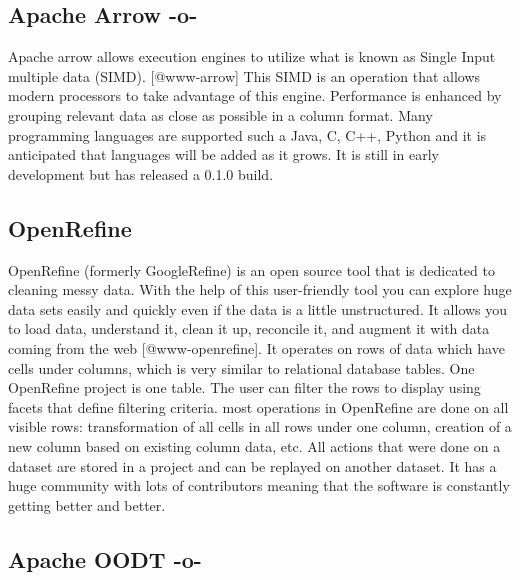 \subsection{Apache Arrow -o-}
     
Apache arrow allows execution engines to utilize what is known as
Single Input multiple data (SIMD). [@www-arrow] This SIMD is an
operation that allows modern processors to take advantage of this
engine.  Performance is enhanced by grouping relevant data as close as
possible in a column format.  Many programming languages are supported
such a Java, C, C++, Python and it is anticipated that languages will
be added as it grows.  It is still in early development but has
released a 0.1.0 build.

\subsection{OpenRefine}

OpenRefine (formerly GoogleRefine) is an open source tool that is
dedicated to cleaning messy data. With the help of this user-friendly
tool you can explore huge data sets easily and quickly even if the
data is a little unstructured. It allows you to load data, understand
it, clean it up, reconcile it, and augment it with data coming from
the web [@www-openrefine]. It operates on rows of data which have
cells under columns, which is very similar to relational database
tables. One OpenRefine project is one table. The user can filter the
rows to display using facets that define filtering criteria. most
operations in OpenRefine are done on all visible rows: transformation
of all cells in all rows under one column, creation of a new column
based on existing column data, etc. All actions that were done on a
dataset are stored in a project and can be replayed on another
dataset. It has a huge community with lots of contributors meaning
that the software is constantly getting better and better.

\subsection{Apache OODT -o-}

